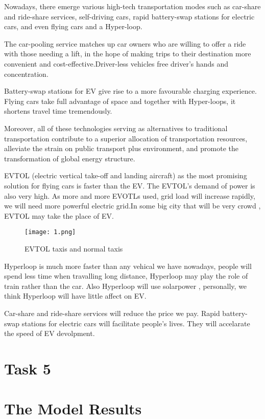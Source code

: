 \documentclass{mcmthesis}
\begin{document}
Nowadays, there emerge various high-tech transportation modes such as car-share and ride-share services, self-driving cars, rapid battery-swap stations for electric cars, and even flying cars and a Hyper-loop.

 The car-pooling service matches up car owners who are willing to offer a ride with those needing a lift, in the hope of making trips to their destination more convenient and cost-effective.Driver-less vehicles free driver’s hands and concentration.

Battery-swap stations for EV give rise to a more favourable charging experience. Flying cars take full advantage of space and together with Hyper-loops, it shortens travel time tremendously. 

Moreover, all of these technologies serving as alternatives to traditional transportation contribute to a superior allocation of transportation resources, alleviate the strain on public transport plus environment, and promote the transformation of global energy structure.

EVTOL (electric vertical take-off and landing aircraft) as the most promising solution for flying cars is faster than the EV. The EVTOL's demand of power is also very high. As more and more EVOTLs used, grid load will increase rapidly, we will need more powerful electric grid.In some big city that will be very crowd , EVTOL may take the place of EV.

\begin{figure}[htbp]
\small
\centering
\texttt{[image: 1.png]}
\caption{EVTOL taxis and normal taxis} 
\end{figure}

Hyperloop is much more faster than any vehical we have nowadays, people will spend less time when travalling long distance, Hyperloop may play the role of train rather than the car. Also Hyperloop will use solarpower , personally, we think Hyperloop will have little affect on EV.

Car-share and ride-share services will reduce the price we pay. Rapid battery-swap stations for electric cars will facilitate people's lives. They will accelarate the speed of EV devolpment.

\section{Task 5 }

\section{The Model Results}
\end{document}

